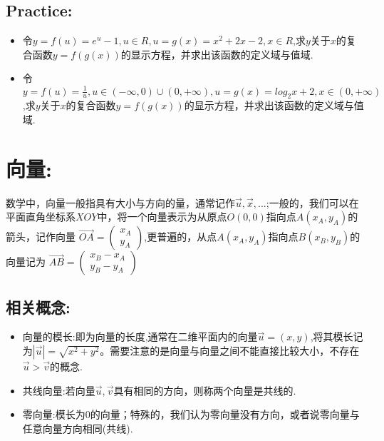 \documentclass[UTF8]{article}
\begin{document}
\subsection{Practice:}

\begin{itemize}
	\item 令$y = f(u) = e^u - 1, u \in R, u = g(x) = x^2 + 2x - 2, x \in R$,求$y$关于$x$的复合函数$y = f(g(x))$的显示方程，并求出该函数的定义域与值域.

	\item 令$y = f(u) = \frac{1}{u}, u \in (-\infty, 0)\cup (0, +\infty), u = g(x) = log_2 x + 2, x \in (0, +\infty)$,求$y$关于$x$的复合函数$y = f(g(x))$的显示方程，并求出该函数的定义域与值域.
\end{itemize}



\section{向量:}

数学中，向量一般指具有大小与方向的量，通常记作$\vec{u}, \vec{x}, ... $;一般的，我们可以在平面直角坐标系$XOY$中，将一个向量表示为从原点$O(0, 0)$指向点$A(x_A, y_A)$的箭头，记作向量
$
\overrightarrow{OA} = 
\left(
\begin{array}{l}
x_A\\
y_A
\end{array}
\right)
$,更普遍的，从点$A(x_A, y_A)$指向点$B(x_B, y_B)$的向量记为
$
\overrightarrow{AB} = 
\left(
\begin{array}{l}
x_B - x_A\\
y_B - y_A
\end{array}
\right)
$


\subsection{相关概念:}

\begin{itemize}
	\item 向量的模长:即为向量的长度,通常在二维平面内的向量$\vec{u} = (x, y)$,将其模长记为$|\vec{u}| = \sqrt{x^2 + y^2}$。需要注意的是向量与向量之间不能直接比较大小，不存在$\vec{u} > \vec{v}$的概念.
	\item 共线向量:若向量$\vec{u}, \vec{v}$具有相同的方向，则称两个向量是共线的.
	\item 零向量:模长为0的向量；特殊的，我们认为零向量没有方向，或者说零向量与任意向量方向相同(共线).
	
\end{itemize}
\end{document}

